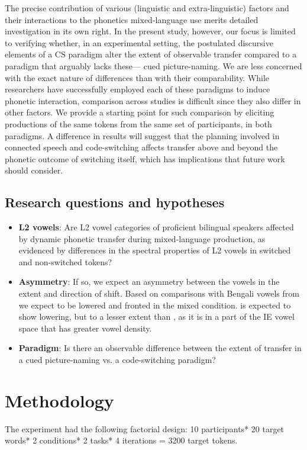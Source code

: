 \documentclass[12 pt]{article}
\newcommand{\nt}[1]{\textipa{[#1]}} %
\begin{document}
The precise contribution of various (linguistic and extra-linguistic) factors and their interactions to the phonetics mixed-language use merits detailed investigation in its own right. In the present study, however, our focus is limited to verifying whether, in an experimental setting, the postulated discursive elements of a CS paradigm alter the extent of observable transfer compared to a paradigm that arguably lacks these--- cued picture-naming. We are less concerned with the exact nature of differences than with their comparability. While researchers have successfully employed each of these paradigms to induce phonetic interaction, comparison across studies is difficult since they also differ in other factors. We provide a starting point for such comparison by eliciting productions of the same tokens from the same set of participants, in both paradigms. A difference in results will suggest that the planning involved in connected speech and code-switching affects transfer above and beyond the phonetic outcome of switching itself, which has implications that future work should consider. 


\subsection{Research questions and hypotheses}\label{questions_and_hypotheses}
\begin{itemize}
	\item \textbf{L2 vowels}: Are L2 vowel categories of proficient bilingual speakers affected by dynamic phonetic transfer during mixed-language production, as evidenced by differences in the spectral properties of L2 vowels in switched and non-switched tokens?
	\item \textbf{Asymmetry}: If so, we expect an asymmetry between the vowels in the extent and direction of shift. Based on comparisons with Bengali vowels from \cite{dutta2021} we expect \nt{2} to be lowered and fronted in the mixed condition. \nt{\ae} is expected to show lowering, but to a lesser extent than \nt{2}, as it is in a part of the IE vowel space that has greater vowel density.
	\item \textbf{Paradigm}: Is there an observable difference between the extent of transfer in a cued picture-naming vs. a code-switching paradigm? 
\end{itemize}


\section{Methodology} \label{methodology}
The experiment had the following factorial design: 10 participants* 20 target words* 2 conditions* 2 tasks* 4 iterations = 3200 target tokens.
\end{document}
